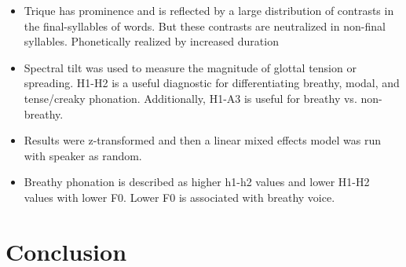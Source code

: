 \documentclass[12pt, letterpaper]{article}
\begin{document}
\begin{itemize}
	\item Trique has prominence and is reflected by a large distribution of contrasts in the final-syllables of words. But these contrasts are neutralized in non-final syllables. Phonetically realized by increased duration
	
	\item Spectral tilt was used to measure the magnitude of glottal tension or spreading. H1-H2 is a useful diagnostic for differentiating breathy, modal, and tense/creaky phonation. Additionally, H1-A3 is useful for breathy vs. non-breathy.
	
	\item Results were z-transformed and then a linear mixed effects model was run with speaker as random.
	
	\item Breathy phonation is described as higher h1-h2 values and lower H1-H2 values with lower F0. Lower F0 is associated with breathy voice.
\end{itemize}

\section{Conclusion} \label{sec:Conclusion}


\printbibliography[heading=bibintoc]
\end{document}
